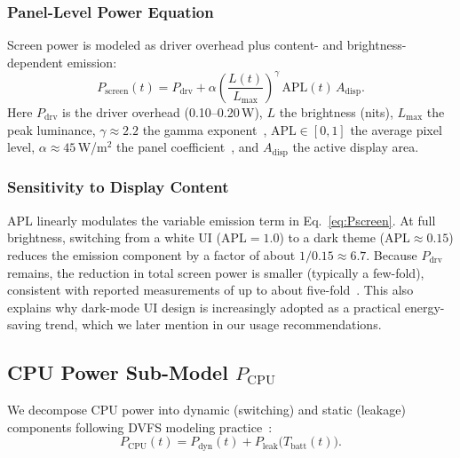 \documentclass{mcmthesis}
\begin{document}
\subsubsection{Panel-Level Power Equation}
Screen power is modeled as driver overhead plus content- and brightness-dependent emission:
\begin{equation}
  P_{\text{screen}}(t)
  = P_{\text{drv}}
  + \alpha \left(\frac{L(t)}{L_{\max}}\right)^{\!\gamma}\,
    \mathrm{APL}(t)\,A_{\text{disp}}.
  \label{eq:Pscreen}
\end{equation}
Here $P_{\text{drv}}$ is the driver overhead (0.10--0.20\,W), $L$ the brightness (nits), $L_{\max}$ the peak luminance, $\gamma \approx 2.2$ the gamma exponent~\cite{ref23}, $\mathrm{APL} \in [0,1]$ the average pixel level, $\alpha \approx 45$\,W/m$^2$ the panel coefficient~\cite{ref24}, and $A_{\text{disp}}$ the active display area.

\subsubsection{Sensitivity to Display Content}
\label{sec:screen:dark}
APL linearly modulates the variable emission term in Eq.~\eqref{eq:Pscreen}.
At full brightness, switching from a white UI ($\mathrm{APL}=1.0$) to a dark theme
($\mathrm{APL}\approx0.15$) reduces the emission component by a factor of about $1/0.15 \approx 6.7$.
Because $P_{\text{drv}}$ remains, the reduction in total screen power is smaller
(typically a few-fold), consistent with reported measurements of up to about five-fold~\cite{ref24}.
This also explains why dark-mode UI design is increasingly adopted as a practical energy-saving trend,
which we later mention in our usage recommendations.

\subsection{CPU Power Sub-Model \texorpdfstring{$P_{\text{CPU}}$}{P\_CPU}}
\label{sec:cpu}

We decompose CPU power into dynamic (switching) and static (leakage) components following DVFS modeling practice~\cite{ref27,ref29}:
\begin{equation}
  P_{\text{CPU}}(t) = P_{\text{dyn}}(t) + P_{\text{leak}}\!\bigl(T_{\text{batt}}(t)\bigr).
  \label{eq:Pcpu}
\end{equation}
\end{document}
